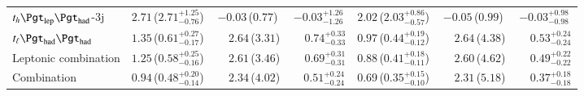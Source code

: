 \begin{table}[t!]
\begin{center}
{\begin{tabular}{lcccccc}
$t_h\tlhad$-3j                  &$2.71$\,($2.71^{+1.25}_{-0.76}$) &$-0.03$\,($0.77$)  &$-0.03^{+1.26}_{-1.26}$ & $2.02$\,($2.03^{+0.86}_{-0.57}$) & $-0.05$\,($0.99$) &$-0.03^{+0.98}_{-0.98}$\\
$t_\ell\thadhad$                   &$1.35$\,($0.61^{+0.27}_{-0.17}$) & \,~~$2.64$\,($3.31$)   & \,~~$0.74^{+0.33}_{-0.33}$  & $0.97$\,($0.44^{+0.19}_{-0.12}$) & \,~~$2.64$\,($4.38$)  & \,~~$0.53^{+0.24}_{-0.24}$\\ \midrule
Leptonic combination            &$1.25\,$($0.58^{+0.25}_{-0.16}$) & \,~~$2.61$\,($3.46$)   & \,~~$0.69^{+0.31}_{-0.31}$  & $0.88$\,($0.41^{+0.18}_{-0.11}$) & \,~~$2.60$\,($4.62$)  & \,~~$0.49^{+0.22}_{-0.22}$\\
\midrule
Combination                     &$0.94$\,($0.48^{+0.20}_{-0.14}$)& \,~~$2.34$\,($4.02$)   &~~$0.51^{+0.24}_{-0.24}$ & $0.69$\,($0.35^{+0.15}_{-0.10}$)& \,~~$2.31$\,($5.18$)& \,~~$0.37^{+0.18}_{-0.18}$  \\
\bottomrule\bottomrule
\end{tabular}
}
\label{tab:limits_summary}
\end{center}
\end{table}



